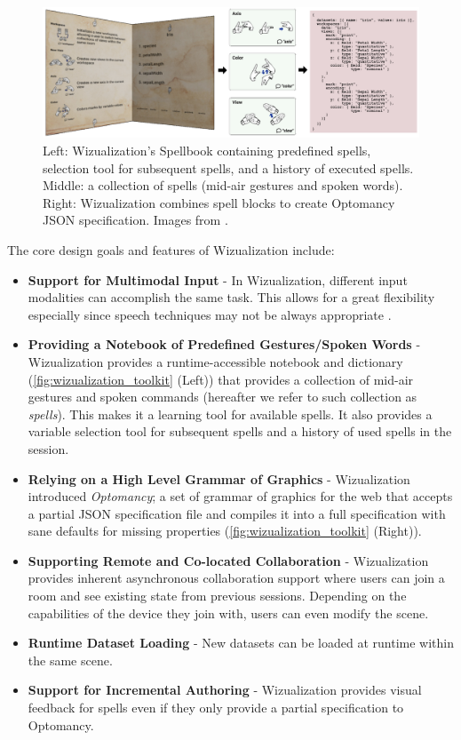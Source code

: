 \documentclass{vgtc}                          %
\begin{document}
\begin{figure}[tb]
	\centering
	\includegraphics[width=\columnwidth]{wizualization_toolkit}
    \caption{Left: Wizualization's Spellbook containing predefined spells, selection tool for subsequent
    spells, and a history of executed spells. Middle: a collection of spells (mid-air gestures and spoken
    words). Right: Wizualization combines spell blocks to create Optomancy JSON specification. Images from
    \cite{wizualization_toolkit}.}
	\label{fig:wizualization_toolkit}
\end{figure}

\noindent The core design goals and features of Wizualization include:
\begin{itemize}
    \item \textbf{Support for Multimodal Input} - In Wizualization, different input modalities can
    accomplish the same task. This allows for a great flexibility especially since speech techniques may not
    be always appropriate \cite{limits_of_speech_recognition}.
    \item \textbf{Providing a Notebook of Predefined Gestures/Spoken Words} - Wizualization provides a
    runtime-accessible notebook and dictionary (\autoref{fig:wizualization_toolkit} (Left)) that provides a collection of mid-air gestures and spoken
    commands (hereafter we refer to such collection as \textit{spells}). This makes it a learning tool for
    available spells. It also provides a variable selection tool for subsequent spells and a history of used
    spells in the session.
    \item \textbf{Relying on a High Level Grammar of Graphics} - Wizualization introduced \textit{Optomancy};
    a set of grammar of graphics for the web that accepts a partial JSON specification file and compiles it
    into a full specification with sane defaults for missing properties (\autoref{fig:wizualization_toolkit} (Right)).
	\item \textbf{Supporting Remote and Co-located Collaboration} - Wizualization provides inherent
    asynchronous collaboration support where users can join a room and see existing state from previous
    sessions. Depending on the capabilities of the device they join with, users can even modify the scene.
    \item \textbf{Runtime Dataset Loading} - New datasets can be loaded at runtime within the same scene.
    \item \textbf{Support for Incremental Authoring} - Wizualization provides visual feedback for spells even
    if they only provide a partial specification to Optomancy.
\end{itemize}
\end{document}

